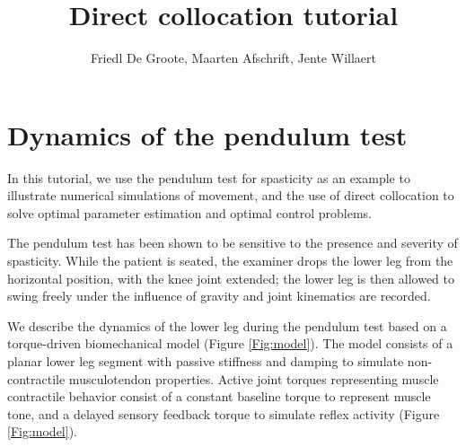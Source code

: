 \documentclass[
a4paper, %
11pt, %
onecolumn, %
openright, %
]{memoir}
\author{Friedl De Groote, Maarten Afschrift, Jente Willaert}
\title{Direct collocation tutorial}
\begin{document}
\frontmatter

\maketitle


\clearpage

\tableofcontents*
\clearpage

\mainmatter

\chapter{Dynamics of the pendulum test}

In this tutorial, we use the pendulum test for spasticity \cite{degroote2018} as an example to illustrate numerical simulations of movement, and the use of direct collocation to solve optimal parameter estimation and optimal control problems. 

The pendulum test has been shown to be sensitive to the presence and severity of spasticity. While the patient is seated, the examiner drops the lower leg from the horizontal position, with the knee joint extended; the lower leg is then allowed to swing freely under the influence of gravity and joint kinematics are recorded.

We describe the dynamics of the lower leg during the pendulum test based on a torque-driven biomechanical model (Figure \ref{Fig:model}). The model consists of a planar lower leg segment with passive stiffness and damping to simulate non-contractile musculotendon properties. Active joint torques representing muscle contractile behavior consist of a constant baseline torque to represent muscle tone, 
and a delayed sensory feedback torque to simulate reflex activity (Figure \ref{Fig:model}).  
\end{document}
